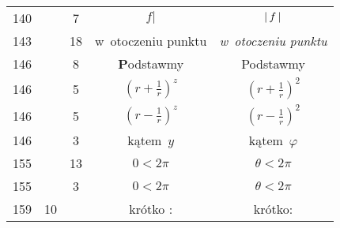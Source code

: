 \documentclass[a4paper,11pt]{article}
\begin{document}
\begin{center}
\begin{tabular}{|c|c|c|c|c|}
    140 & & \hphantom{0}7 & $f |$ & $|\, {  f  } \,|$ \\
    143 & & 18 & w~otoczeniu punktu & \textit{w~otoczeniu punktu} \\
    146 & & \hphantom{0}8 & \textbf{P}odstawmy & Podstawmy \\
    146 & & \hphantom{0}5 & $( r + \frac{ 1 }{ r } )^{ z }$
           & $( r + \frac{ 1 }{ r } )^{ 2 }$ \\
    146 & & \hphantom{0}5 & $( r - \frac{ 1 }{ r } )^{ z }$
           & $( r - \frac{ 1 }{ r } )^{ 2 }$ \\
    146 & & \hphantom{0}3 & kątem~$y$ & kątem~$\varphi$ \\
    155 & & 13 & $0 < 2\pi$ & $\theta < 2\pi$ \\
    155 & & \hphantom{0}3 & $0 < 2\pi$ & $\theta < 2\pi$ \\
    159 & 10 & & krótko : & krótko: \\
    \hline
  \end{tabular}





  \newpage


\end{center}
\end{document}
